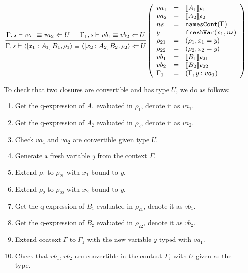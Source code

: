 \documentclass{article}
\theoremstyle{remark}
\begin{document}
\begin{align}
  \begin{prooftree}
    \hypo{\Gamma,s \vdash va_1 \equiv va_2 \Leftarrow U}
    \hypo{\Gamma_1,s \vdash vb_1 \equiv vb_2 \Leftarrow U}
    \infer2{\Gamma,s \vdash \langle [x_1 : A_1] \, B_1, \rho_1 \rangle \equiv \langle [x_2 : A_2] \, B_2, \rho_2 \rangle \Leftarrow U} 
  \end{prooftree}\left(\begin{array}{l l l}
                         va_1 &= & \llbracket A_1 \rrbracket \rho_1 \\ 
                         va_2 &= & \llbracket A_2 \rrbracket \rho_2 \\ 
                         ns &= & \texttt{namesCont}(\Gamma) \\
                         y &= & \texttt{freshVar}(x_1, ns) \\
                         \rho_{21} &= & (\rho_1, x_1 = y) \\
                         \rho_{22} &= & (\rho_2, x_2 = y) \\
                         vb_1 &= & \llbracket B_1 \rrbracket \rho_{21} \\
                         vb_2 &= & \llbracket B_2 \rrbracket \rho_{22} \\
                         \Gamma_1 &= & (\Gamma, y : va_1)
                       \end{array}\right)
\end{align}

To check that two closures are convertible and has type $U$, we do as follows:
\begin{enumerate}
\item Get the q-expression of $A_1$ evaluated in $\rho_1$, denote it as $va_1$.
\item Get the q-expression of $A_2$ evaluated in $\rho_2$, denote it as $va_2$.
\item Check $va_1$ and $va_2$ are convertible given type $U$.
\item Generate a fresh variable $y$ from the context $\Gamma$.
\item Extend $\rho_1$ to $\rho_{21}$ with $x_1$ bound to $y$.
\item Extend $\rho_2$ to $\rho_{22}$ with $x_2$ bound to $y$.
\item Get the q-expression of $B_1$ evaluated in $\rho_{21}$, denote it as $vb_1$.
\item Get the q-expression of $B_2$ evaluated in $\rho_{22}$, denote it as $vb_2$.
\item Extend context $\Gamma$ to $\Gamma_1$ with the new variable $y$ typed with $va_1$.
\item Check that $vb_1$, $vb_2$ are convertible in the context $\Gamma_1$ with $U$ given as the type.
\end{enumerate}
\end{document}
